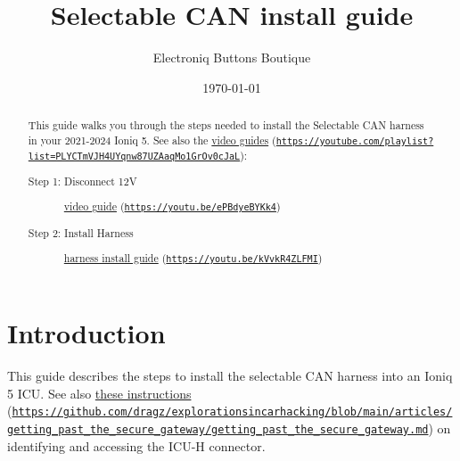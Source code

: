 \documentclass[superscriptaddress,onecolumn,floatfix]{revtex4-2}
\begin{document}
                            
\begin{abstract}
  This guide walks you through the steps needed to install the Selectable CAN harness in your 2021-2024 Ioniq 5. See also the \href{https://youtube.com/playlist?list=PLYCTmVJH4UYqnw87UZAaqMo1GrOv0cJaL}{video guides} (\href{https://youtube.com/playlist?list=PLYCTmVJH4UYqnw87UZAaqMo1GrOv0cJaL}{\nolinkurl{https://youtube.com/playlist?list=PLYCTmVJH4UYqnw87UZAaqMo1GrOv0cJaL}}):
  \begin{description}
    \item[Step 1: Disconnect 12V] \href{https://youtu.be/ePBdyeBYKk4}{video guide} (\href{https://youtu.be/ePBdyeBYKk4}{\nolinkurl{https://youtu.be/ePBdyeBYKk4}})
    \item[Step 2: Install Harness] \href{https://youtu.be/kVvkR4ZLFMI}{harness install guide} (\href{https://youtu.be/kVvkR4ZLFMI}{\nolinkurl{https://youtu.be/kVvkR4ZLFMI}})
  \end{description}
\end{abstract}
\title{Selectable CAN install guide}
\author{Electroniq Buttons Boutique}
\date{\today}

\maketitle


\section{Introduction}
This guide describes the steps to install the selectable CAN harness into an Ioniq 5 ICU. See also \href{https://github.com/dragz/explorationsincarhacking/blob/main/articles/getting_past_the_secure_gateway/getting_past_the_secure_gateway.md}{these instructions} (\href{https://github.com/dragz/explorationsincarhacking/blob/main/articles/getting_past_the_secure_gateway/getting_past_the_secure_gateway.md}{\nolinkurl{https://github.com/dragz/explorationsincarhacking/blob/main/articles/getting_past_the_secure_gateway/getting_past_the_secure_gateway.md}}) on identifying and accessing the ICU-H connector.
\end{document}
